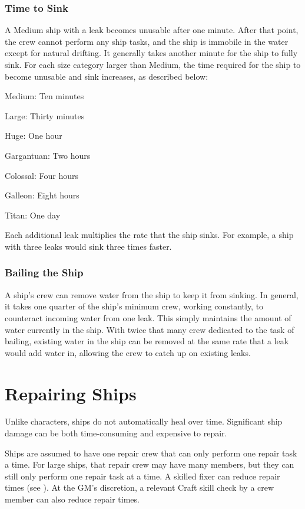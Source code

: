     \subsubsection{Time to Sink}
      A Medium ship with a leak becomes unusable after one minute.
      After that point, the crew cannot perform any ship tasks, and the ship is immobile in the water except for natural drifting.
      It generally takes another minute for the ship to fully sink.
      For each size category larger than Medium, the time required for the ship to become unusable and sink increases, as described below:
      \begin{raggeditemize}
        \item Medium: Ten minutes
        \item Large: Thirty minutes
        \item Huge: One hour
        \item Gargantuan: Two hours
        \item Colossal: Four hours
        \item Galleon: Eight hours
        \item Titan: One day
      \end{raggeditemize}

      Each additional leak multiplies the rate that the ship sinks.
      For example, a ship with three leaks would sink three times faster.

    \subsubsection{Bailing the Ship}
      A ship's crew can remove water from the ship to keep it from sinking.
      In general, it takes one quarter of the ship's minimum crew, working constantly, to counteract incoming water from one leak.
      This simply maintains the amount of water currently in the ship.
      With twice that many crew dedicated to the task of bailing, existing water in the ship can be removed at the same rate that a leak would add water in, allowing the crew to catch up on existing leaks.

\section{Repairing Ships}
  Unlike characters, ships do not automatically heal over time.
  Significant ship damage can be both time-consuming and expensive to repair.

  Ships are assumed to have one repair crew that can only perform one repair task a time.
  For large ships, that repair crew may have many members, but they can still only perform one repair task at a time.
  A skilled fixer can reduce repair times (see ).
  At the GM's discretion, a relevant Craft skill check by a crew member can also reduce repair times.

